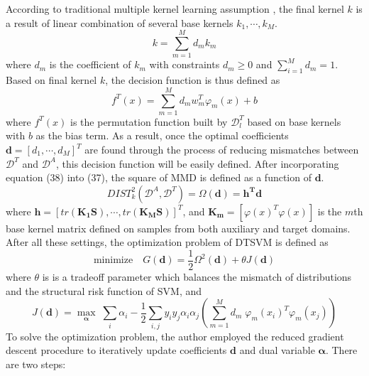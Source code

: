 \noindent According to traditional multiple kernel learning assumption \cite{lanckriet2004learning}, the final kernel $k$ is a result of linear combination of several base kernels $k_1, \cdots, k_M$.
\begin{equation}
k = \sum_{m=1}^{M}d_m k_m
\end{equation}
where $d_m$ is the coefficient of $k_m$ with constraints $d_m \geq 0$ and $\sum_{i=1}^{M}d_m = 1$. Based on final kernel $k$, the decision function is thus defined as
\begin{equation}
f^T(x) = \sum_{m=1}^{M} d_m w_m^T \varphi_m(x) + b 
\end{equation}
where $f^T(x)$ is the permutation function built by $\mathcal{D}_l^T$ based on base kernels with $b$ as the bias term. As a result, once the optimal coefficients $\mathbf{d}=[d_1, \cdots, d_M]^T$ are found through the process of reducing mismatches between $\mathcal{D}^T$ and $\mathcal{D}^A$, this decision function will be easily defined. After incorporating equation (38) into (37), the square of MMD is defined as a function of $\mathbf{d}$.
\begin{equation}
DIST_k^2(\mathcal{D}^A, \mathcal{D}^T) = \Omega(\mathbf{d}) = \mathbf{h^T d}
\end{equation}
where $\mathbf{h} = [tr(\mathbf{K_1 S}), \cdots, tr(\mathbf{K_MS})]^T$, and $\mathbf{K_m} = [\varphi(x)^T \varphi(x)]$ is the $m$th base kernel matrix defined on samples from both auxiliary and target domains. After all these settings, the optimization problem of DTSVM is defined as 
\begin{equation}
\text{minimize} \quad G(\mathbf{d}) = \frac{1}{2} \Omega^2(\mathbf{d}) + \theta J(\mathbf{d})
\end{equation}
where $\theta$ is is a tradeoff parameter which balances the mismatch of distributions and the structural risk function of SVM, and 
  \begin{equation}
  J(\mathbf{d}) = \underset{\boldsymbol{\alpha}}{\max} \; \sum_i \alpha_i - \frac{1}{2} \sum_{i,j} y_i y_j \alpha_i \alpha_j  (\sum_{m=1}^M d_m \; \varphi_m (x_i) ^T \varphi_m (x_j))           
  \end{equation}
To solve the optimization problem, the author \cite{duan2009domain} employed the reduced gradient descent procedure to iteratively update coefficients $\mathbf{d}$ and dual variable $\boldsymbol{\alpha}$. There are two steps:
